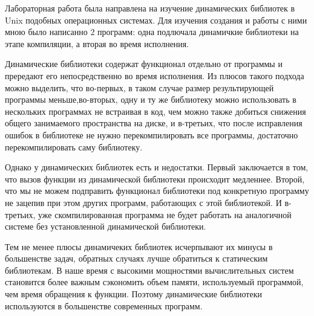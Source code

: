 \documentclass[pdf, unicode, 12pt, a4paper,oneside,fleqn]{article}
\begin{document}
Лабораторная работа была направлена на изучение динамических библиотек в Unix подобных операционных
системах. Для изучения создания и работы с ними мною было написанно 2 программ: одна
подлючала динамичкие библиотеки на этапе компиляции, а вторая во время исполнения.

Динамические библиотеки содержат функционал отдельно от программы и прередают его
непосредственно во время исполнения. Из плюсов такого подхода можно выделить, что 
во-первых, в таком случае размер результирующей программы меньше,во-вторых, одну и ту же библиотеку 
можно использовать в нескольких программах не встраивая в код, чем можно также добиться снижения
общего занимаемого пространства на диске, и в-третьих, что после исправления ошибок
в библиотеке не нужно перекомпилировать все программы, достаточно перекомпилировать саму библиотеку.

Однако у динамических библиотек есть и недостатки. Первый заключается в том, что
вызов функции из динамической библиотеки происходит медленнее. Второй, что
мы не можем подправить функционал библиотеки под конкретную программу не зацепив
при этом других программ, работающих с этой библиотекой. И в-третьих, уже скомпилированная
программа не будет работать на аналогичной системе без установленной динамической библиотеки.

Тем не менее плюсы динамичеких библиотек исчерпывают их минусы в большенстве задач, 
обратных случаях лучше обратиться к статическим библиотекам. В наше время с высокими мощностями 
вычислительных систем становится более важным сэкономить объем памяти, используемый программой,
чем время обращения к функции. Поэтому динамические библиотеки используются в большенстве 
современных программ.
\end{document}
